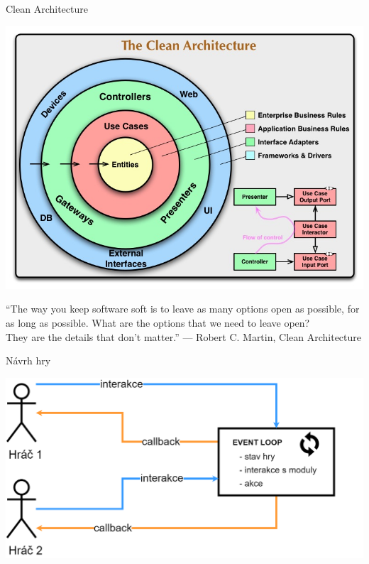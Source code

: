 \documentclass[czech,aspectratio=169]{beamer}
\begin{document}
  \begin{frame}{Clean Architecture}
    \begin{center}
      \includegraphics[width=.6\textwidth]{assets/slides/logo-clean-architecture}
    \end{center}
  \end{frame}

  \begin{frame}
      \begin{center}
        {\large ``The way you keep software soft is
      to leave as many options open as possible,
      for as long as possible.
      What are the options that we need to leave open?\\
      They are the details
      that don’t matter.''}
      \vskip5mm
      --- Robert C. Martin, Clean Architecture
      \end{center}
  \end{frame}

  \begin{frame}{Návrh hry}
    \begin{center}
      \includegraphics[width=.9\textwidth]{assets/slides/event-loop}
    \end{center}
  \end{frame}
\end{document}
